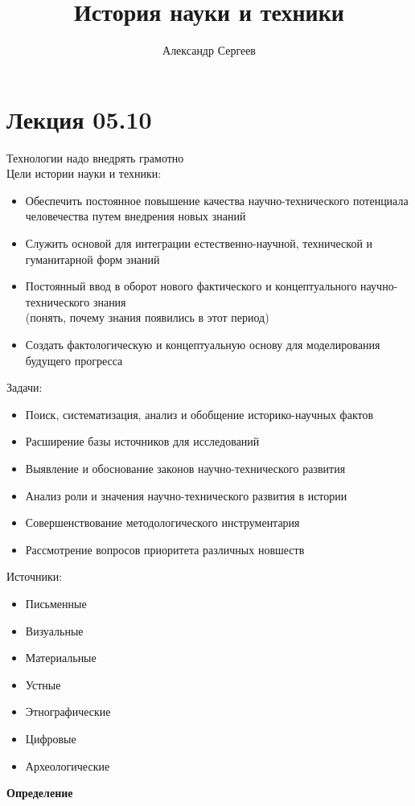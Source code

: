 \documentclass[12pt]{article}
\title{История науки и техники}
\author{Александр Сергеев}
\date{}
\begin{document}
\maketitle
\section{Лекция 05.10}
Технологии надо внедрять грамотно\\
Цели истории науки и техники:
\begin{itemize}
    \item Обеспечить постоянное повышение качества научно-технического потенциала человечества путем внедрения новых знаний
    \item Служить основой для интеграции естественно-научной, технической и гуманитарной форм знаний
    \item Постоянный ввод в оборот нового фактического и концептуального научно-технического знания\\
    (понять, почему знания появились в этот период)
    \item Создать фактологическую и концептуальную основу для моделирования будущего прогресса
\end{itemize}
Задачи:
\begin{itemize}
    \item Поиск, систематизация, анализ и обобщение историко-научных фактов
    \item Расширение базы источников для исследований
    \item Выявление и обоснование законов научно-технического развития
    \item Анализ роли и значения научно-технического развития в истории
    \item Совершенствование методологического инструментария
    \item Рассмотрение вопросов приоритета различных новшеств
\end{itemize}
Источники:
\begin{itemize}
    \item Письменные
    \item Визуальные
    \item Материальные
    \item Устные
    \item Этнографические
    \item Цифровые
    \item Археологические
\end{itemize}
\textbf{Определение}\\
\end{document}
